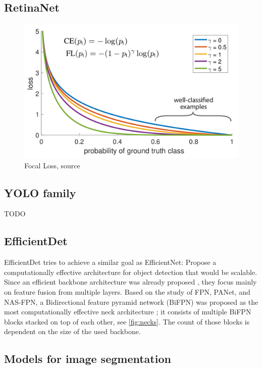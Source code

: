 \subsection{RetinaNet}

\begin{figure}
    \centering
    \includegraphics[width=0.7\linewidth]{images/focal_loss.png}
    \caption{Focal Loss, source \cite{Lin2017}}
\end{figure}

\subsection{YOLO family}
TODO

\subsection{EfficientDet}
EfficientDet tries to achieve a similar goal as EfficientNet: Propose a computationally effective architecture for object detection that would be scalable. Since an efficient backbone architecture was already proposed \cite{Tan2019a}, they focus mainly on feature fusion from multiple layers. Based on the study of FPN, PANet, and NAS-FPN, a Bidirectional feature pyramid network (BiFPN) was proposed as the most computationally effective neck architecture \cite{Tan2019}; it consists of multiple BiFPN blocks stacked on top of each other, see \ref{fig:necks}. The count of those blocks is dependent on the size of the used backbone.

\subsection{Models for image segmentation}
